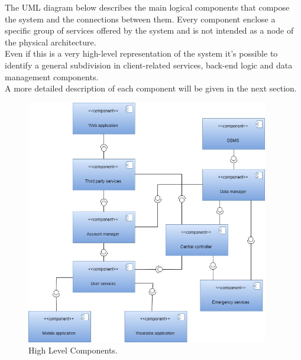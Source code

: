 \clearpage
\noindent The UML diagram below describes the main logical components that compose the system and the connections between them.
Every component enclose a specific group of services offered by the system and is not intended as a node of the physical architecture. \\
Even if this is a very high-level representation of the system it's possible to identify a general subdivision in client-related services, back-end logic and data management components. \\
A more detailed description of each component will be given in the next section. \\

\begin{figure}[ht]
    \centering
    \includegraphics[width=300pt]{images/High-Level_Components.jpg}
    \caption{High Level Components.}
    \label{HLC}
\end{figure}
\clearpage

